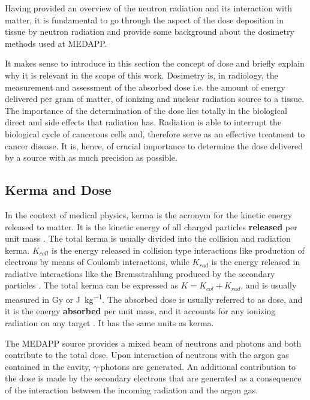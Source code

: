Having provided an overview of the neutron radiation and its interaction with matter, it is fundamental to go through the aspect of the dose deposition in tissue by neutron radiation and provide some background about the dosimetry methods used at MEDAPP. 
 
It makes sense to introduce in this section the concept of dose and briefly explain why it is relevant in the scope of this work. Dosimetry is, in radiology, the measurement and assessment of the absorbed dose i.e. the amount of energy delivered per gram of matter, of ionizing and nuclear radiation source to a tissue. The importance of the determination of the dose lies totally in the biological direct and side effects that radiation has. Radiation is able to interrupt the biological cycle of cancerous cells and, therefore serve as an effective treatment to cancer disease. It is, hence, of crucial importance to determine the dose delivered by a source with as much precision as possible. 

\subsection{Kerma and Dose}
In the context of medical physics, kerma is the acronym for the kinetic energy released to matter. It is the kinetic energy of all charged particles \textbf{released} per unit mass \cite{AtomsRadiationAndRadiationProtection}. The total kerma is usually divided into the collision and radiation kerma. $K_{coll}$ is the energy released in collision type interactions like production of electrons by means of Coulomb interactions, while $K_{rad}$ is the energy released in radiative interactions like the Bremsstrahlung produced by the secondary particles \cite{RadiationOncologyInPhysicsHandbook}. The total kerma can be expressed as $K = K_{col} + K_{rad}$, and is usually measured in \unit{\gray} or \unit{\joule\per\kilo\gram}.
\newpage
The absorbed dose is usually referred to as dose, and it is the energy \textbf{absorbed} per unit mass, and it accounts for any ionizing radiation on any target \cite{AtomsRadiationAndRadiationProtection}. It has the same units as kerma. 


The MEDAPP source provides a mixed beam of neutrons and photons and both contribute to the total dose. Upon interaction of neutrons with the argon gas contained in the cavity, $\gamma$-photons are generated. An additional contribution to the dose is made by the secondary electrons that are generated as a consequence of the interaction between the incoming radiation and the argon gas. %

